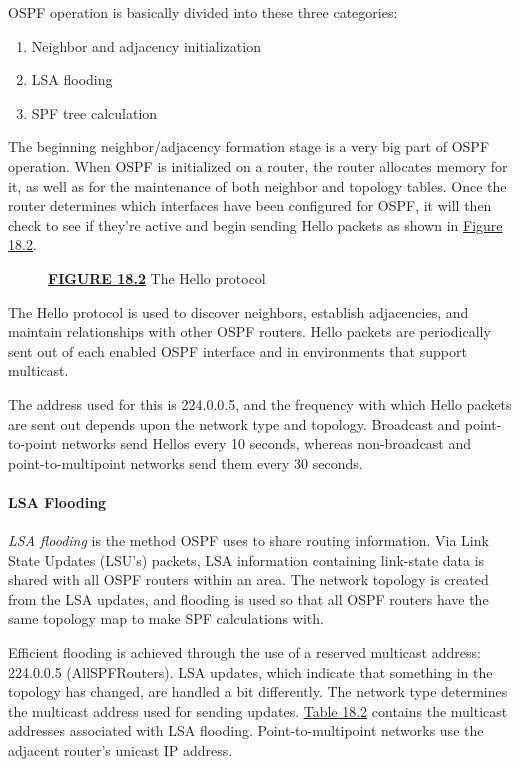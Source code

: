 OSPF operation is basically divided into these three categories:

\begin{enumerate}
\tightlist
\item
  Neighbor and adjacency initialization
\item
  LSA flooding
\item
  SPF tree calculation
\end{enumerate}

The beginning neighbor/adjacency formation stage is a very big part of
OSPF operation. When OSPF is initialized on a router, the router
allocates memory for it, as well as for the maintenance of both neighbor
and topology tables. Once the router determines which interfaces have
been configured for OSPF, it will then check to see if they're active
and begin sending Hello packets as shown in
\protect\hyperlink{c18.xhtmlux5cux23figure18-2}{Figure 18.2}.

\begin{figure}
\centering
\caption{{\protect\hyperlink{c18.xhtmlux5cux23figureanchor18-2}{\textbf{FIGURE
18.2}} The Hello protocol}}
\end{figure}

The Hello protocol is used to discover neighbors, establish adjacencies,
and maintain relationships with other OSPF routers. Hello packets are
periodically sent out of each enabled OSPF interface and in environments
that support multicast.

\protect\hypertarget{c18.xhtmlux5cux23Page_752}{}{}The address used for
this is 224.0.0.5, and the frequency with which Hello packets are sent
out depends upon the network type and topology. Broadcast and
point-to-point networks send Hellos every 10 seconds, whereas
non-broadcast and point-to-multipoint networks send them every 30
seconds.

\paragraph{LSA Flooding}

\emph{LSA flooding} is the method OSPF uses to share routing
information. Via Link State Updates (LSU's) packets, LSA information
containing link-state data is shared with all OSPF routers within an
area. The network topology is created from the LSA updates, and flooding
is used so that all OSPF routers have the same topology map to make SPF
calculations with.

Efficient flooding is achieved through the use of a reserved multicast
address: 224.0.0.5 (AllSPFRouters). LSA updates, which indicate that
something in the topology has changed, are handled a bit differently.
The network type determines the multicast address used for sending
updates. \protect\hyperlink{c18.xhtmlux5cux23table18-2}{Table 18.2}
contains the multicast addresses associated with LSA flooding.
Point-to-multipoint networks use the adjacent router's unicast IP
address.

